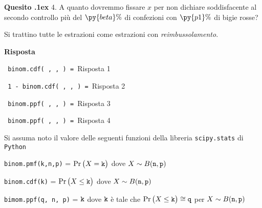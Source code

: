 \documentclass[11pt,twoside,a4paper]{article}
\newcounter{quesito}
\newenvironment{question}{\bigskip\addtocounter{quesito}{1}\bigskip\bigskip\par\textbf{Quesito \thequesito.\kern1ex}}{\vspace{\parskip}}
\newenvironment{answer}{\par\textbf{Risposta\quad}}{\vspace{\parskip}}
\begin{document}
\begin{question}
4. A quanto dovremmo fissare $x$ per non  dichiare soddisfacente al secondo controllo più del $\py{beta}\%$ di confezioni con $\py{p1}\%$ di bigie rosse?

Si trattino tutte le estrazioni come estrazioni con \textit{reimbussolamento}.

\begin{answer}

{\tt {\color{blue} binom.cdf( , ,  )} = }\hfill  {\color{blue}Risposta 1}

{\tt {\color{blue} 1 - binom.cdf( , ,  )} = }\hfill  {\color{blue}Risposta 2}

{\tt {\color{blue} binom.ppf( , ,  )} = }\hfill  {\color{blue}Risposta 3}

{\tt {\color{blue} binom.ppf( , ,  )} = }\hfill {\color{blue}Risposta 4}

\end{answer}
\end{question}



\vfill
\hrulefill

Si assuma noto il valore delle seguenti funzioni della libreria {\tt scipy.stats\/} di  {\tt Python\/}

{\tt binom.pmf(k,n,p)} = $\Pr\big(X={\tt k}\big)$ dove $X\sim B({\tt n},{\tt p})$ 

{\tt binom.cdf(k)} = $\Pr\big(X\le{\tt k}\big)$ dove  $X\sim B({\tt n},{\tt p})$ 

{\tt bimom.ppf(q, n, p)} = ${\tt k}$ dove ${\tt k}$ è tale che $\Pr\big(X\le{\tt k}\big)\cong{\tt q}$ per $X\sim B({\tt n},{\tt p})$ 
\end{document}
